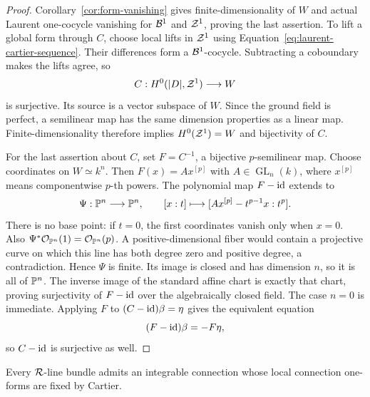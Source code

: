 \begin{proof}
Corollary~\ref{cor:form-vanishing} gives finite-dimensionality of
\(W\) and actual Laurent one-cocycle vanishing for \(\mathcal B^1\)
and \(\mathcal Z^1\), proving the last assertion.  To lift a global form
through \(C\), choose local lifts in \(\mathcal Z^1\) using
Equation~\eqref{eq:laurent-cartier-sequence}.  Their differences
form a \(\mathcal B^1\)-cocycle.  Subtracting a coboundary makes the
lifts agree, so
\[
 C:H^0(|D|,\mathcal Z^1)\longrightarrow W
\]
is surjective.  Its source is a vector subspace of \(W\).
Since the ground field is perfect, a semilinear map has the same
dimension properties as a linear map.  Finite-dimensionality
therefore implies \(H^0(\mathcal Z^1)=W\) and bijectivity of \(C\).

For the last assertion about \(C\), set \(F=C^{-1}\), a bijective
\(p\)-semilinear map.  Choose coordinates on \(W\simeq k^n\).
Then \(F(x)=A x^{[p]}\) with \(A\in\operatorname{GL}_n(k)\),
where \(x^{[p]}\) means componentwise \(p\)-th powers.  The
polynomial map \(F-\operatorname{id}\) extends to
\begin{equation}
 \Psi:\mathbb P^n\longrightarrow\mathbb P^n,
 \qquad
 [x:t]\longmapsto
 [A x^{[p]}-t^{p-1}x:t^p].
 \label{eq:semilinear-projective-map}
\end{equation}
There is no base point: if \(t=0\), the first coordinates vanish
only when \(x=0\).  Also \(\Psi^*\mathcal O_{\mathbb P^n}(1)=
\mathcal O_{\mathbb P^n}(p)\).  A positive-dimensional fiber would contain
a projective curve on which this line has both degree zero and
positive degree, a contradiction.  Hence \(\Psi\) is finite.
Its image is closed and has dimension \(n\), so it is all of
\(\mathbb P^n\).  The inverse image of the standard affine chart is
exactly that chart, proving surjectivity of \(F-\operatorname{id}\) over the
algebraically closed field.  The case \(n=0\) is immediate.
Applying \(F\) to \((C-\operatorname{id})\beta=\eta\) gives the equivalent
equation
\[
 (F-\operatorname{id})\beta=-F\eta,
\]
so \(C-\operatorname{id}\) is surjective as well.
\end{proof}

\begin{lemma}
\label{lem:cartier-fixed-connection}
Every \(\mathcal R\)-line bundle admits an integrable connection whose
local connection one-forms are fixed by Cartier.
\end{lemma}

